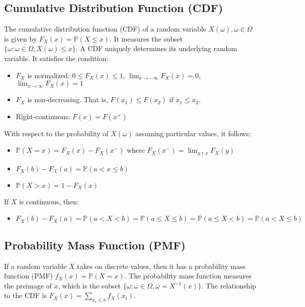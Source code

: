 \subsection{Cumulative Distribution Function (CDF)}
The cumulative distribution function (CDF) of a random variable $X(\omega), \omega \in \Omega$ is given by $F_X(x) = \mathbb{P}(X\leq x)$. It measures the subset $\{\omega : \omega\in\Omega, X(\omega)\leq x \}$. A CDF uniquely determines its underlying random variable. It satisfies the condition:

\begin{itemize}
\item $F_X$ is normalized: $0\leq F_X(x) \leq 1$, $\lim_{x\rightarrow -\infty} F_X(x) = 0$,  $\lim_{x\rightarrow \infty} F_X(x) = 1$
\item $F_X$ is non-decreasing. That is, $F(x_1) \leq F(x_2)$ if $x_1 \leq x_2$. 
\item Right-continuous: $F(x) = F(x^+)$
\end{itemize}

With respect to the probability of $X(\omega)$ assuming particular values, it follows:

\begin{itemize}
\item $\mathbb{P}(X = x) = F_X(x) - F_X(x^-)$ where $F_X(x^{-}) = \lim_{y\uparrow x}F_X(y)$
\item $F_X(b) - F_X(a) = \mathbb{P}(a < x \leq b)$
\item $\mathbb{P}(X > x) = 1-F_X(x)$ 
\end{itemize}

If $X$ is continuous, then: 

\begin{itemize}
\item $F_X(b) - F_X(a) = \mathbb{P}(a<X<b) = \mathbb{P}(a\leq X\leq b) = \mathbb{P}(a\leq X<b) = \mathbb{P}(a<X \leq b)$
\end{itemize}

\subsection{Probability Mass Function (PMF)}
If a random variable $X$ takes on discrete values, then it has a probability mass function (PMF) $f_X(x) = \mathbb{P}(X = x)$. The probability mass function measures the preimage of $x$, which is the subset $\{\omega: \omega \in \Omega, \omega=X^{-1}(x) \}$. The relationship to the CDF is $F_X(x) = \sum_{x_i \leq x} f_X(x_i)$.

